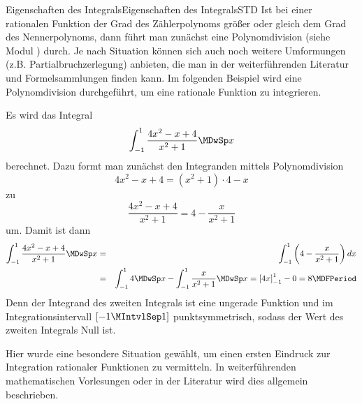 \begin{MXContent}{Eigenschaften des Integrals}{Eigenschaften des Integrals}{STD}
Ist bei einer rationalen Funktion der Grad des Zählerpolynoms größer oder gleich 
dem Grad des Nennerpolynoms, dann führt man zunächst eine Polynomdivision 
(siehe Modul ) durch. Je nach Situation können sich auch noch 
weitere Umformungen (z.B. Partialbruchzerlegung) anbieten, die man in der
weiterführenden Literatur und Formelsammlungen finden kann. Im folgenden Beispiel
wird eine Polynomdivision durchgeführt, um eine rationale Funktion zu integrieren.

\begin{MExample}
Es wird das Integral
\[
\int_{-1}^{1} \frac{4 x^2 - x + 4}{x^2 + 1} \MDwSp x %
\]
berechnet.
Dazu formt man zunächst den Integranden mittels Polynomdivision 
\[
4 x^2 - x + 4 = (x^2 + 1) \cdot 4 - x %
\]
zu
\[
\frac{4 x^2 - x + 4}{x^2 + 1} = 4 - \frac{x}{x^2 + 1} %
\]
um. Damit ist dann
\begin{eqnarray*}
\int_{-1}^{1} \frac{4 x^2 - x + 4}{x^2 + 1} \MDwSp x %
& = & 
\int_{-1}^{1} \left(4 - \frac{x}{x^2 + 1}\right) \MD x \\
& = & 
\int_{-1}^{1} 4 \MDwSp x - \int_{-1}^{1} \frac{x}{x^2 + 1} \MDwSp x %
= \left[4 x\right]_{-1}^{1} - 0 %
= 8 \MDFPeriod
\end{eqnarray*}
Denn der Integrand des zweiten Integrals ist eine ungerade Funktion und im 
Integrationsintervall $[-1\MIntvlSep 1]$ punktsymmetrisch, sodass der Wert
des zweiten Integrals Null ist.

Hier wurde eine besondere Situation gewählt, um einen ersten Eindruck zur
Integration rationaler Funktionen zu vermitteln. In weiterführenden 
mathematischen Vorlesungen oder in der Literatur wird dies allgemein beschrieben.
\end{MExample}

\end{MXContent}


